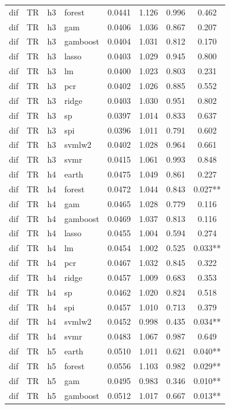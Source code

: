 \begin{ThreePartTable}
\begin{longtable}[t]{llclcccc}
dif & TR & h3 & forest & 0.0441 & 1.126 & 0.996 & 0.462\\
dif & TR & h3 & gam & 0.0406 & 1.036 & 0.867 & 0.207\\
dif & TR & h3 & gamboost & 0.0404 & 1.031 & 0.812 & 0.170\\
dif & TR & h3 & lasso & 0.0403 & 1.029 & 0.945 & 0.800\\
dif & TR & h3 & lm & 0.0400 & 1.023 & 0.803 & 0.231\\
dif & TR & h3 & pcr & 0.0402 & 1.026 & 0.885 & 0.552\\
dif & TR & h3 & ridge & 0.0403 & 1.030 & 0.951 & 0.802\\
dif & TR & h3 & sp & 0.0397 & 1.014 & 0.833 & 0.637\\
dif & TR & h3 & spi & 0.0396 & 1.011 & 0.791 & 0.602\\
dif & TR & h3 & svmlw2 & 0.0402 & 1.028 & 0.964 & 0.661\\
dif & TR & h3 & svmr & 0.0415 & 1.061 & 0.993 & 0.848\\
\addlinespace
dif & TR & h4 & earth & 0.0475 & 1.049 & 0.861 & 0.227\\
dif & TR & h4 & forest & 0.0472 & 1.044 & 0.843 & 0.027**\\
dif & TR & h4 & gam & 0.0465 & 1.028 & 0.779 & 0.116\\
dif & TR & h4 & gamboost & 0.0469 & 1.037 & 0.813 & 0.116\\
dif & TR & h4 & lasso & 0.0455 & 1.004 & 0.594 & 0.274\\
dif & TR & h4 & lm & 0.0454 & 1.002 & 0.525 & 0.033**\\
dif & TR & h4 & pcr & 0.0467 & 1.032 & 0.845 & 0.322\\
dif & TR & h4 & ridge & 0.0457 & 1.009 & 0.683 & 0.353\\
dif & TR & h4 & sp & 0.0462 & 1.020 & 0.824 & 0.518\\
dif & TR & h4 & spi & 0.0457 & 1.010 & 0.713 & 0.379\\
dif & TR & h4 & svmlw2 & 0.0452 & 0.998 & 0.435 & 0.034**\\
dif & TR & h4 & svmr & 0.0483 & 1.067 & 0.987 & 0.649\\
\addlinespace
dif & TR & h5 & earth & 0.0510 & 1.011 & 0.621 & 0.040**\\
dif & TR & h5 & forest & 0.0556 & 1.103 & 0.982 & 0.029**\\
dif & TR & h5 & gam & 0.0495 & 0.983 & 0.346 & 0.010**\\
dif & TR & h5 & gamboost & 0.0512 & 1.017 & 0.667 & 0.013**\\

\end{longtable}
\end{ThreePartTable}
